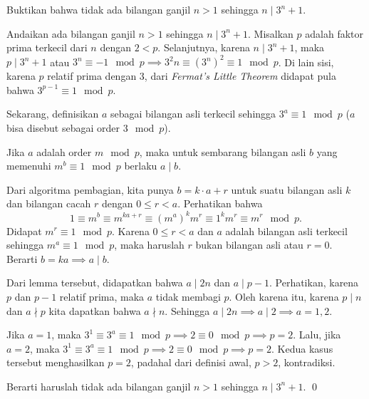 \documentclass[11pt]{scrartcl}
\begin{document}
	\newpage
	\begin{soalbaru}
		Buktikan bahwa tidak ada bilangan ganjil $n > 1$ sehingga $n \mid 3^n+1$.\\[-10pt]
	\end{soalbaru}
	\begin{solusi}
	Andaikan ada bilangan ganjil $n>1$ sehingga $n \mid 3^n+1$.
	Misalkan $p$ adalah faktor prima terkecil dari $n$ dengan $2< p$. Selanjutnya, karena $n \mid 3^n+1$, maka $p \mid 3^n+1$ atau $3^n \equiv -1 \mod p \implies 3^2n \equiv (3^n)^2 \equiv 1 \mod p$. Di lain sisi, karena $p$ relatif prima dengan 3, dari \textit{ Fermat's Little Theorem }didapat pula bahwa $3^{p-1} \equiv 1 \mod p$.
	
	Sekarang, definisikan $a$ sebagai bilangan asli terkecil sehingga $3^a \equiv 1 \mod p$ ($a$ bisa disebut sebagai order $3 \mod p$). 
	\begin{lemmarev}
		Jika $a$ adalah order $m\mod p$, maka untuk sembarang bilangan asli $b$ yang memenuhi $m^b \equiv 1 \mod p$ berlaku $a\mid b$.
		\begin{buktilemma}
		Dari algoritma pembagian, kita punya $b=k\cdot a + r$ untuk suatu bilangan asli $k$ dan bilangan cacah $r$ dengan $0 \le r < a$. Perhatikan bahwa $$1 \equiv m^b \equiv m^{ka+r} \equiv (m^a)^km^r \equiv 1^km^r \equiv m^r \mod p.$$ Didapat $m^r \equiv 1 \mod p$. Karena $0 \le r < a$ dan $a$ adalah bilangan asli terkecil sehingga $m^a \equiv 1 \mod p$, maka haruslah $r$ bukan bilangan asli atau $r=0$. Berarti $b=ka \implies a \mid b$.
		\end{buktilemma}
	\end{lemmarev}
	Dari lemma tersebut, didapatkan bahwa $a \mid 2n$ dan $a \mid p-1$. Perhatikan, karena $p$ dan $p-1$ relatif prima, maka $a$ tidak membagi $p$. Oleh karena itu, karena $p \mid n$ dan $a \nmid p$ kita dapatkan bahwa $a \nmid n$. Sehingga $a \mid 2n \implies a \mid 2 \implies a=1,2$.
	
	Jika $a=1$, maka $3^1 \equiv 3^a \equiv 1 \mod p \implies 2 \equiv 0 \mod p \implies p = 2$. Lalu, jika $a=2$, maka $3^1 \equiv 3^a \equiv 1 \mod p \implies 2 \equiv 0 \mod p \implies p = 2$. Kedua kasus tersebut menghasilkan $p=2$, padahal dari definisi awal, $p > 2$, kontradiksi.
	
	Berarti haruslah tidak ada bilangan ganjil $n>1$ sehingga $n \mid 3^n+1$. \qed
	\end{solusi}
\end{document}
